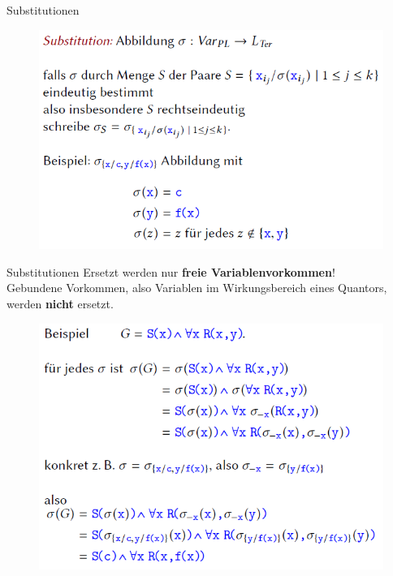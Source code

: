 \begin{frame}{Substitutionen}
	\begin{figure}[h!]
		\centering
		\includegraphics[scale=0.6]{subs.png} \hspace{2em} 
	\end{figure} 
\end{frame}

\begin{frame}{Substitutionen}
	Ersetzt werden nur \textbf{freie Variablenvorkommen}!\\
	Gebundene Vorkommen, also Variablen im Wirkungsbereich eines Quantors, werden \textbf{nicht} ersetzt.
	
	\pause
	\begin{figure}[h!]
		\centering
		\includegraphics[scale=0.5]{subs_bsp.png} \hspace{2em} 
	\end{figure} 
\end{frame}

